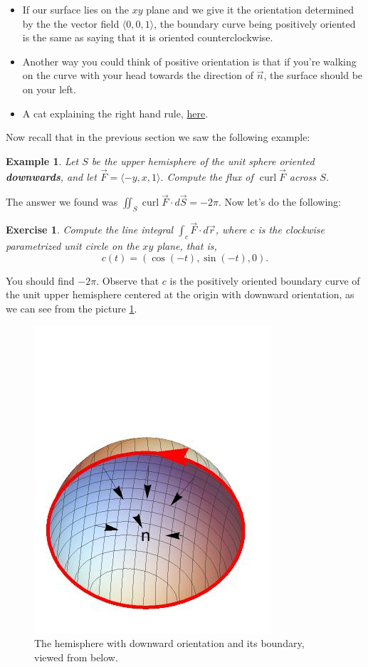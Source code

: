 \documentclass[12pt]{article}
\newcommand{\vr}{\vec{r}{}}
\newcommand{\vF}{\vec{F}}
\renewcommand{\lg}{\langle}
\newcommand{\rg}{\rangle}
\DeclareMathOperator{\curl}{curl}
\newcommand{\vn}{\vec{n}}
\newcommand{\vS}{\vec{S}}
\newtheorem{example}{Example}
\newtheorem{exercise}{Exercise}
\begin{document}
\begin{itemize}
\item If our surface lies on the $xy$ plane and we give it the orientation determined by the the vector field $\lg 0,0,1\rg$, the boundary curve being positively oriented is the same as saying that it is oriented counterclockwise.
\item Another way you could think of positive orientation is that  if you're walking on the curve with your head towards the direction of $\vn$, the surface should be on your left.
\item A cat explaining the right hand rule, \href{http://sites.math.washington.edu/~neptamin/324Au17/Notes/16.8/righthandrule.gif}{here}.
\end{itemize}


Now recall that in the previous section we saw the following example: 
\begin{example}
Let $S$ be the upper hemisphere of the unit sphere oriented \textbf{downwards}, and let $\vF=\lg -y,x,1\rg.$ Compute the flux of $\curl\vF $ across $S$.
\end{example}
The answer we found was $\iint_S\curl \vF\cdot d\vS=-2\pi$. Now let's do the following:
\begin{exercise}
Compute the line integral $\int_c\vF\cdot d\vr$, where $c$ is the clockwise parametrized unit circle on the $xy$ plane, that is, $$c(t)=\left (\cos(-t),\sin(-t),0\right ).$$
\end{exercise}
You should find $-2\pi$. Observe that $c$ is the positively oriented boundary curve of the unit upper hemisphere centered at the origin with downward orientation, as we can see from the picture \ref{fig3}. 

\begin{figure}[h]
\begin{center}
\includegraphics[scale=.4]{hemi.jpeg}
\caption{The hemisphere with downward orientation and its boundary, viewed from below.}
\label{fig3}
\end{center}
\end{figure}
\end{document}
